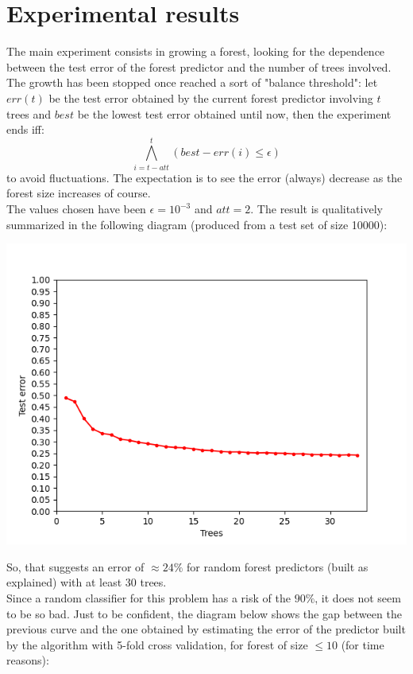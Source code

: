 \documentclass[12pt]{article}
\begin{document}
\section{Experimental results}
The main experiment consists in growing a forest, looking for the dependence\\ between the test error of the forest predictor and the number of trees involved.\\
The growth has been stopped once reached a sort of "balance threshold": let $err(t)$ be the test error obtained by the current forest predictor involving $t$ trees and $best$ be the lowest test error obtained until now, then the experiment ends iff: $$\bigwedge_{i = t - att}^t \left(best - err(i) \le \epsilon\right)$$ to avoid fluctuations. The expectation is to see the error (always) decrease as the forest size increases of course.\\
The values chosen have been $\epsilon = 10^{-3}$ and $att = 2$.
\newpage
The result is qualitatively summarized in the following diagram (produced from a test set of size 10000):
\begin{center}
\includegraphics[width=1.3\textwidth]{Images/Test_error_diag.png}
\end{center}
So, that suggests an error of $\approx 24\%$ for random forest predictors (built as explained) with at least 30 trees.\\
Since a random classifier for this problem has a risk of the $90\%$, it does not seem to be so bad.
\newpage
Just to be confident, the diagram below shows the gap between the\\ previous curve and the one obtained by estimating the error of the predictor built by the algorithm with 5-fold cross validation, for forest of size $\le 10$ (for time reasons):
\end{document}
